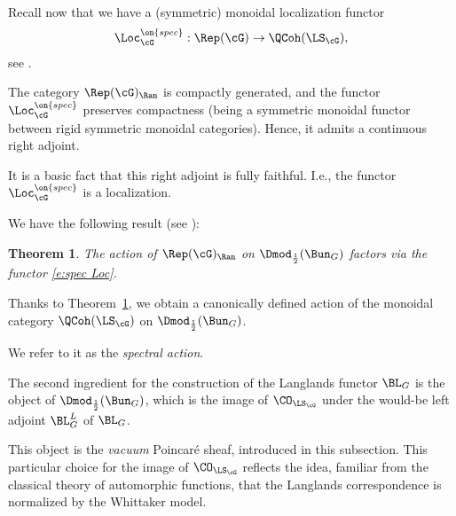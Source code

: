 \documentclass[9pt]{amsart}
\newtheorem{thm}[subsubsection]{Theorem}
\theoremstyle{remark}
\theoremstyle{definition}
\theoremstyle{remark}
\newcommand{\thmref}[1]{Theorem~\ref{#1}}
\numberwithin{equation}{section}
\begin{document}
\sssec{}

Recall now that we have a (symmetric) monoidal localization functor
\begin{equation} \label{e:spec Loc}
\Loc_\cG^{\on{spec}}:\Rep(\cG)\to \QCoh(\LS_\cG),
\end{equation} 
see \cite[Sect. 4.3]{Ga2}. 

\medskip

The category $\Rep(\cG)_\Ran$ is compactly generated, and the functor $\Loc_\cG^{\on{spec}}$
preserves compactness (being a symmetric monoidal functor between rigid symmetric monoidal
categories). Hence, it admits a continuous right adjoint.

\medskip

It is a basic fact that this right adjoint is fully faithful.
I.e., the functor $\Loc_\cG^{\on{spec}}$ is a localization. 

\sssec{}

We have the following result (see \cite[Corollary 4.5.5]{Ga2}):

\begin{thm} \label{t:spectral decomp}
The action of $\Rep(\cG)_\Ran$ on $\Dmod_{\frac{1}{2}}(\Bun_G)$ 
factors via the functor \eqref{e:spec Loc}.
\end{thm} 

\sssec{} \label{sss:spectral action}

Thanks to \thmref{t:spectral decomp}, we obtain a canonically defined action of the monoidal category $\QCoh(\LS_\cG)$
on $\Dmod_{\frac{1}{2}}(\Bun_G)$. 

\medskip

We refer to it as the \emph{spectral action}. 

%
%
%
%
%


The second ingredient for the construction of the Langlands functor $\BL_G$ is the object of 
$\Dmod_{\frac{1}{2}}(\Bun_G)$, which is the image of $\CO_{\LS_\cG}$ under the 
would-be left adjoint $\BL_G^L$ of $\BL_G$. 

\medskip

This object is the \emph{vacuum} Poincar\'e sheaf, introduced in this subsection. This particular
choice for the image of $\CO_{\LS_\cG}$ reflects the idea, familiar from the classical theory of
automorphic functions, that the Langlands correspondence is normalized by the Whittaker model. 
\end{document}

